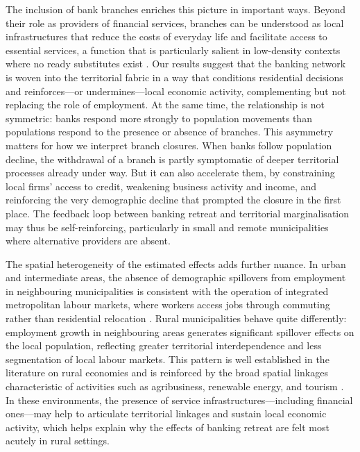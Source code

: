 \documentclass[a4paper,11pt,oneside]{article}
\begin{document}
{The inclusion of bank branches enriches this picture in important ways. Beyond their role as providers of financial services, branches can be understood as local infrastructures that reduce the costs of everyday life and facilitate access to essential services, a function that is particularly salient in low-density contexts where no ready substitutes exist \citep{leyshon.thrift1995geographies}. Our results suggest that the banking network is woven into the territorial fabric in a way that conditions residential decisions and reinforces---or undermines---local economic activity, complementing but not replacing the role of employment. At the same time, the relationship is not symmetric: banks respond more strongly to population movements than populations respond to the presence or absence of branches. This asymmetry matters for how we interpret branch closures. When banks follow population decline, the withdrawal of a branch is partly symptomatic of deeper territorial processes already under way. But it can also accelerate them, by constraining local firms' access to credit, weakening business activity and income, and reinforcing the very demographic decline that prompted the closure in the first place. The feedback loop between banking retreat and territorial marginalisation may thus be self-reinforcing, particularly in small and remote municipalities where alternative providers are absent.

The spatial heterogeneity of the estimated effects adds further nuance. In urban and intermediate areas, the absence of demographic spillovers from employment in neighbouring municipalities is consistent with the operation of integrated metropolitan labour markets, where workers access jobs through commuting rather than residential relocation \citep{boarnet1994empirical}. Rural municipalities behave quite differently: employment growth in neighbouring areas generates significant spillover effects on the local population, reflecting greater territorial interdependence and less segmentation of local labour markets. This pattern is well established in the literature on rural economies \citep{henry1997hinterland} and is reinforced by the broad spatial linkages characteristic of activities such as agribusiness, renewable energy, and tourism \citep{feser2006harnessing}. In these environments, the presence of service infrastructures---including financial ones---may help to articulate territorial linkages and sustain local economic activity, which helps explain why the effects of banking retreat are felt most acutely in rural settings.

}
\end{document}
